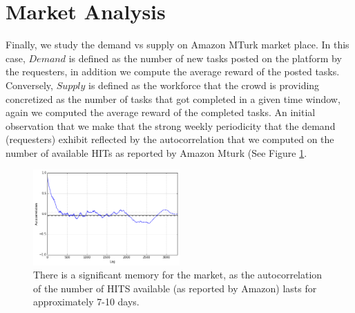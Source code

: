 \section{Market Analysis}
\label{sec:market}
Finally, we study the demand vs supply on Amazon MTurk market place.
In this case, $Demand$ is defined as the number of new tasks posted on the platform by the requesters, in addition we compute the average reward of the posted tasks. Conversely, $Supply$ is defined as the workforce that the crowd is providing concretized as the number of tasks that got completed in a given time window, again we computed the average reward of the completed tasks.
An initial observation that we make that the strong weekly periodicity that the demand (requesters) exhibit reflected by the autocorrelation that we computed on the number of available HITs as reported by Amazon Mturk (See Figure \ref{fig:autocorrelation1}.
\begin{figure}[htbp]
	\centering
		\includegraphics[width=0.5\textwidth]{figures/autocorrelation_plot}
	\caption{There is a significant memory for the market, as the autocorrelation of the 
number of HITS available (as reported by Amazon) lasts for approximately 7-10 days.}
	\label{fig:autocorrelation1}
\end{figure}

